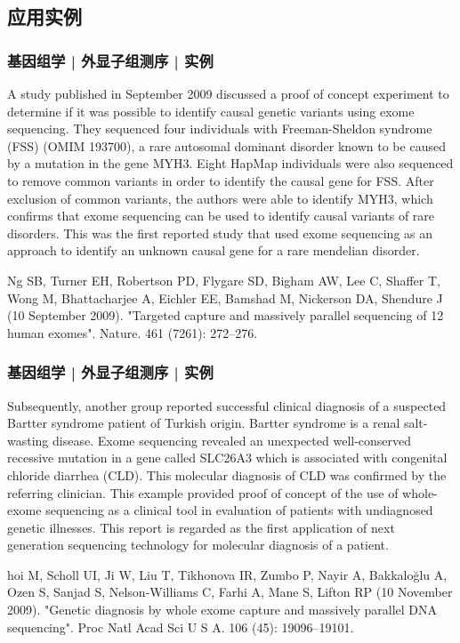\subsection{应用实例}
\begin{frame}
  \frametitle{基因组学 |  外显子组测序  | 实例}
  A study published in September 2009 discussed a proof of concept experiment to determine if it was possible to identify causal genetic variants using exome sequencing. They sequenced four individuals with Freeman-Sheldon syndrome (FSS) (OMIM 193700), a rare autosomal dominant disorder known to be caused by a mutation in the gene MYH3. Eight HapMap individuals were also sequenced to remove common variants in order to identify the causal gene for FSS. After exclusion of common variants, the authors were able to identify MYH3, which confirms that exome sequencing can be used to identify causal variants of rare disorders. This was the first reported study that used exome sequencing as an approach to identify an unknown causal gene for a rare mendelian disorder.

  Ng SB, Turner EH, Robertson PD, Flygare SD, Bigham AW, Lee C, Shaffer T, Wong M, Bhattacharjee A, Eichler EE, Bamshad M, Nickerson DA, Shendure J (10 September 2009). "Targeted capture and massively parallel sequencing of 12 human exomes". Nature. 461 (7261): 272–276.
\end{frame}

\begin{frame}
  \frametitle{基因组学 | 外显子组测序  | 实例}
  Subsequently, another group reported successful clinical diagnosis of a suspected Bartter syndrome patient of Turkish origin. Bartter syndrome is a renal salt-wasting disease. Exome sequencing revealed an unexpected well-conserved recessive mutation in a gene called SLC26A3 which is associated with congenital chloride diarrhea (CLD). This molecular diagnosis of CLD was confirmed by the referring clinician. This example provided proof of concept of the use of whole-exome sequencing as a clinical tool in evaluation of patients with undiagnosed genetic illnesses. This report is regarded as the first application of next generation sequencing technology for molecular diagnosis of a patient.

  hoi M, Scholl UI, Ji W, Liu T, Tikhonova IR, Zumbo P, Nayir A, Bakkaloğlu A, Ozen S, Sanjad S, Nelson-Williams C, Farhi A, Mane S, Lifton RP (10 November 2009). "Genetic diagnosis by whole exome capture and massively parallel DNA sequencing". Proc Natl Acad Sci U S A. 106 (45): 19096–19101.
\end{frame}

